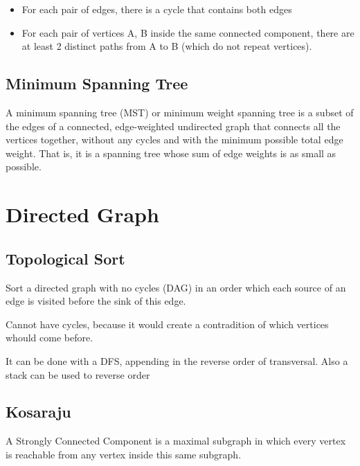	\begin{itemize}
		\item For each pair of edges, there is a cycle that contains both edges
		\item For each pair of vertices {A, B} inside the same connected component, there are at least 2 distinct paths from A to B (which do not repeat vertices).
	\end{itemize}

	
	\subsection{Minimum Spanning Tree}

	A minimum spanning tree (MST) or minimum weight spanning tree is a subset of the edges
	of a connected, edge-weighted undirected graph that connects all the vertices together,
	without any cycles and with the minimum possible total edge weight.
	That is, it is a spanning tree whose sum of edge weights is as small as possible.


	\section{Directed Graph}

	\subsection{Topological Sort}

	Sort a directed graph with no cycles (DAG) in an order which each source of an edge is visited before the sink of this edge.

	Cannot have cycles, because it would create a contradition of which vertices whould come before.

	It can be done with a DFS, appending in the reverse order of transversal. Also a stack can be used to reverse order	


	\subsection{Kosaraju}

	A Strongly Connected Component is a maximal subgraph in which every vertex is reachable
	from any vertex inside this same subgraph.

